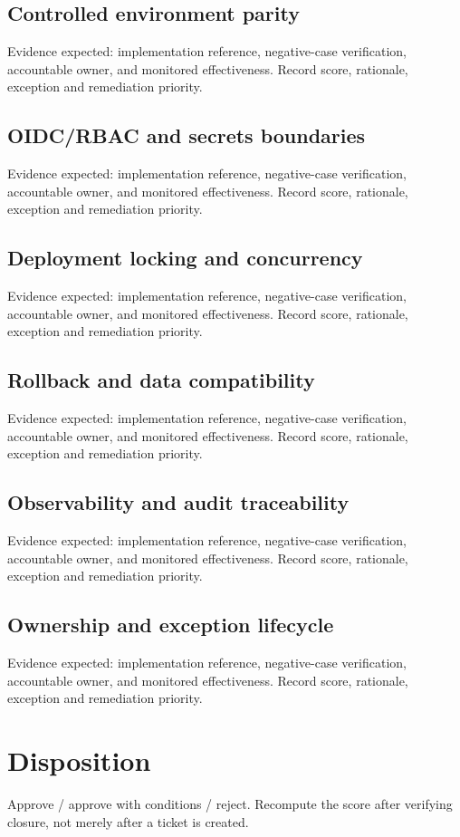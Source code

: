 \documentclass[10pt,letterpaper]{article}
\begin{document}
\subsection{Controlled environment parity}
Evidence expected: implementation reference, negative-case verification, accountable owner, and monitored effectiveness. Record score, rationale, exception and remediation priority.


\subsection{OIDC/RBAC and secrets boundaries}
Evidence expected: implementation reference, negative-case verification, accountable owner, and monitored effectiveness. Record score, rationale, exception and remediation priority.


\subsection{Deployment locking and concurrency}
Evidence expected: implementation reference, negative-case verification, accountable owner, and monitored effectiveness. Record score, rationale, exception and remediation priority.


\subsection{Rollback and data compatibility}
Evidence expected: implementation reference, negative-case verification, accountable owner, and monitored effectiveness. Record score, rationale, exception and remediation priority.


\subsection{Observability and audit traceability}
Evidence expected: implementation reference, negative-case verification, accountable owner, and monitored effectiveness. Record score, rationale, exception and remediation priority.


\subsection{Ownership and exception lifecycle}
Evidence expected: implementation reference, negative-case verification, accountable owner, and monitored effectiveness. Record score, rationale, exception and remediation priority.


\section{Disposition}
Approve / approve with conditions / reject. Recompute the score after verifying closure, not merely after a ticket is created.
\end{document}
